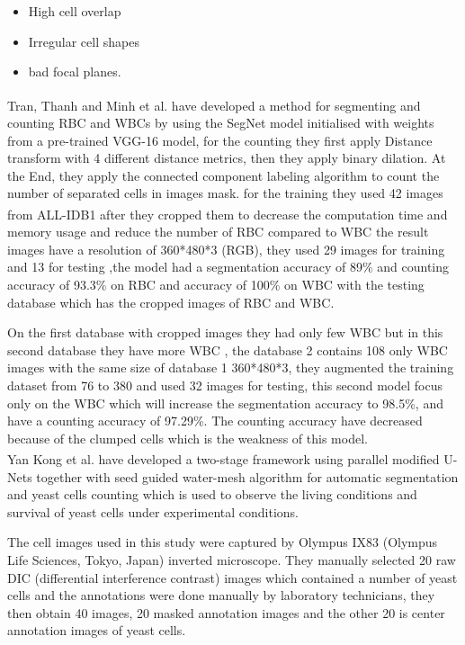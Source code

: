 {\begin{itemize}
  \item High cell overlap
  \item Irregular cell shapes
  \item bad focal planes.
\end{itemize}

Tran, Thanh and Minh et al. \textsuperscript{\cite{tran2019blood}} have developed a method for segmenting and counting RBC and WBCs by using the SegNet model initialised with weights from a pre-trained VGG-16 model, for the counting they first apply Distance transform with 4 different distance metrics, then they apply binary dilation. At the End, they apply the connected component labeling algorithm to count the number of separated cells in images mask. for the training they used 42 images from ALL-IDB1 \textsuperscript{\cite{labati2011all}} after they cropped them to decrease the computation time and memory usage and reduce the number of RBC compared to WBC the result images have a resolution of 360*480*3 (RGB), they used 29 images for training and 13 for testing ,the model had a segmentation accuracy of 89\% and counting accuracy of 93.3\% on RBC and accuracy of 100\% on WBC with the testing database which has the cropped images of RBC and WBC.\

On the first database with cropped images they had only few WBC but in this second database they have more WBC , the database 2 contains 108 only WBC images with the same size of database 1 360*480*3, they augmented the training dataset from 76 to 380 and used 32 images for testing, this second model focus only on the WBC which will increase the segmentation accuracy to 98.5\%, and have a counting accuracy of 97.29\%. The counting accuracy have decreased because of the clumped cells which is the weakness of this model.\\

Yan Kong et al. \textsuperscript{\cite{Kong:20}} have developed a two-stage framework using parallel modified U-Nets together with seed guided water-mesh algorithm for automatic segmentation and yeast cells counting which is used to observe the living conditions and survival of yeast cells under experimental conditions.\

The cell images used in this study were captured by Olympus IX83 (Olympus Life Sciences, Tokyo, Japan) inverted microscope. They manually selected 20 raw DIC (differential interference contrast) images which contained a number of yeast cells and the annotations were done manually by laboratory technicians, they then obtain 40 images, 20 masked annotation images and the other 20 is center annotation images of yeast cells.\

}
